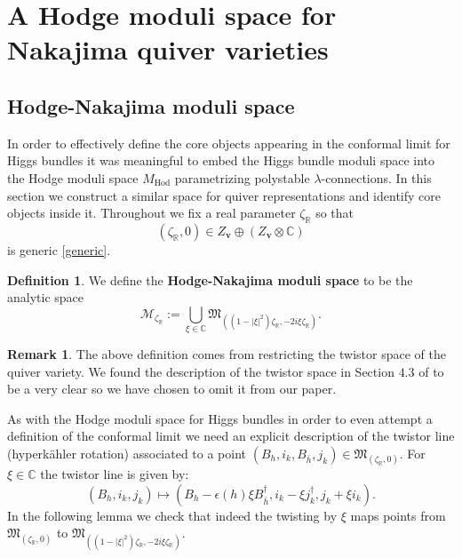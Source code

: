 \documentclass[12pt,oneside,reqno]{amsart}
\theoremstyle{definition}
\newtheorem{remark}[theorem]{Remark}
\newtheorem{definition}[theorem]{Definition}
\numberwithin{equation}{section}
\numberwithin{theorem}{section}
\newcommand{\R}{\mathbb{R}}
\newcommand{\C}{\mathbb{C}}
\newcommand{\Hod}{\operatorname{Hod}}
\begin{document}
\section{A Hodge moduli space for Nakajima quiver varieties}

 \subsection{Hodge-Nakajima moduli space} In order to effectively define the core objects appearing in the conformal limit for Higgs bundles it was meaningful to embed the Higgs bundle moduli space into the Hodge moduli space $M_{\Hod}$ parametrizing polystable $\lambda$-connections. In this section we construct a similar space for quiver representations and identify core objects inside it. Throughout we fix a real parameter $\zeta_{\R}$ so that 
%
\begin{equation*}
(\zeta_{\R},0) \in Z_{\mathbf{v}}\oplus(Z_{\mathbf{v}}\otimes\C)
\end{equation*}
%
is generic \eqref{generic}.
%
\begin{definition}
We define the \textbf{Hodge-Nakajima moduli space} to be the analytic space 
%
\begin{equation}
\mathcal M_{\zeta_{\R}} := \bigcup\limits_{\xi \in \C} \mathfrak M_{((1-|\xi| ^2)\zeta_{\R},-2i\xi \zeta_{\R})}.
\end{equation}
%
\end{definition}
%
%
\begin{remark}
The above definition comes from restricting the twistor space of the quiver variety. We found the description of the twistor space in Section $4.3$ of \cite{HKR} to be a very clear so we have chosen to omit it from our paper. 
\end{remark}
%
As with the Hodge moduli space for Higgs bundles in order to even attempt a definition of the conformal limit we need an explicit description of the twistor line (hyperk\"ahler rotation) associated to a point $(B_h,i_k,B_{\bar h},j_k) \in \mathfrak M_{(\zeta_\R,0)}$. For $\xi \in \C$  the twistor line is given by:
%
\begin{equation}\label{hrotation}
     (B_h,i_k,j_k) \longmapsto (B_h-\epsilon(h)\xi B_{\bar{h}}^\dagger,i_k-\xi j_k^\dagger,j_k+\xi i_k).
\end{equation}
%
In the following lemma we check that indeed the twisting by $\xi$ maps points from $\mathfrak M_{(\zeta_{\R},0)}$ to $\mathfrak M_{((1-|\xi| ^2)\zeta_{\R},-2i\xi \zeta_{\R})}$. 
%
\end{document}
